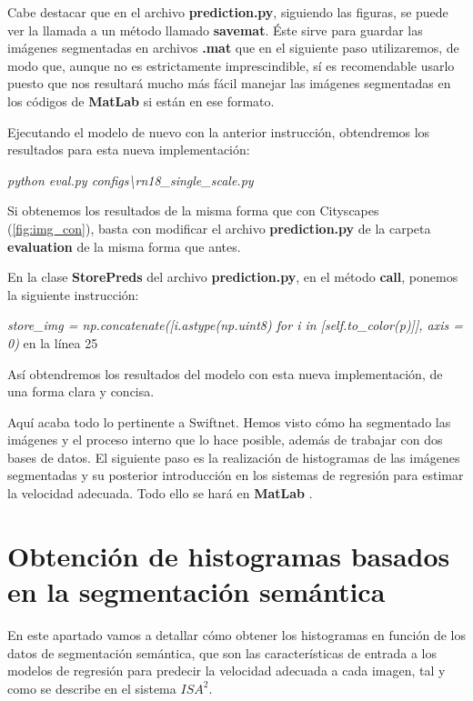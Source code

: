 \begin{itemize}
Cabe destacar que en el archivo \textbf{prediction.py}, siguiendo las figuras, se puede ver la llamada a un método llamado \textbf{savemat}. Éste sirve para guardar las imágenes segmentadas en archivos \textbf{.mat} que en el siguiente paso utilizaremos, de modo que, aunque no es estrictamente imprescindible, sí es recomendable usarlo puesto que nos resultará mucho más fácil manejar las imágenes segmentadas en los códigos de \textbf{MatLab} \cite{matlab} si están en ese formato.

\end{itemize}

Ejecutando el modelo de nuevo con la anterior instrucción, obtendremos los resultados para esta nueva implementación:

\begin{center}
\textit{python eval.py configs\textbackslash{rn18\_single\_scale.py}}
\end{center}

Si obtenemos los resultados de la misma forma que con Cityscapes (\ref{fig:img_con}), basta con modificar el archivo \textbf{prediction.py} de la carpeta \textbf{evaluation} de la misma forma que antes.

En la clase \textbf{StorePreds} del archivo \textbf{prediction.py}, en el método \textbf{call}, ponemos la siguiente instrucción:

\begin{center}
\textit{store\_img = np.concatenate([i.astype(np.uint8) for i in [self.to\_color(p)]], axis = 0)} en la línea 25
\end{center}

Así obtendremos los resultados del modelo con esta nueva implementación, de una forma clara y concisa.

Aquí acaba todo lo pertinente a Swiftnet. Hemos visto cómo ha segmentado las imágenes y el proceso interno que lo hace posible, además de trabajar con dos bases de datos. El siguiente paso es la realización de histogramas de las imágenes segmentadas y su posterior introducción en los sistemas de regresión para estimar la velocidad adecuada. Todo ello se hará en \textbf{MatLab} \cite{matlab}.

\section{Obtención de histogramas basados en la segmentación semántica}

En este apartado vamos a detallar cómo obtener los histogramas en función de los datos de segmentación semántica, que son las características de entrada a los modelos de regresión para predecir la velocidad adecuada a cada imagen, tal y como se describe en el sistema $ISA^{2}$.

